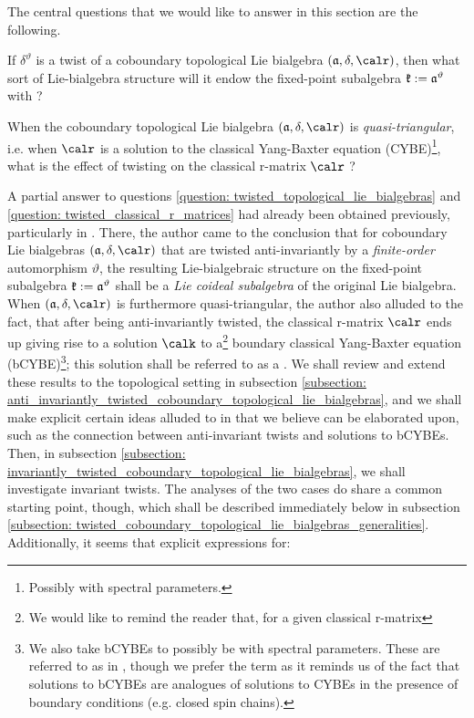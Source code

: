         The central questions that we would like to answer in this section are the following.
        \begin{question} \label{question: twisted_topological_lie_bialgebras}
            If $\delta^{\vartheta}$ is a twist of a coboundary topological Lie bialgebra $(\a, \delta, \calr)$, then what sort of Lie-bialgebra structure will it endow the fixed-point subalgebra $\mathfrak{k} := \mathfrak{a}^{\vartheta}$ with ?
        \end{question}
        \begin{question} \label{question: twisted_classical_r_matrices}
            When the coboundary topological Lie bialgebra $(\a, \delta, \calr)$ is \textit{quasi-triangular}, i.e. when $\calr$ is a solution to the classical Yang-Baxter equation (CYBE)\footnote{Possibly with spectral parameters.}, what is the effect of twisting on the classical r-matrix $\calr$ ?
        \end{question}
        A partial answer to questions \ref{question: twisted_topological_lie_bialgebras} and \ref{question: twisted_classical_r_matrices} had already been obtained previously, particularly in \cite{schrader_integrable_systems_from_classical_reflection_equations}. There, the author came to the conclusion that for  coboundary Lie bialgebras $(\a, \delta, \calr)$ that are twisted anti-invariantly by a \textit{finite-order} automorphism $\vartheta$, the resulting Lie-bialgebraic structure on the fixed-point subalgebra $\mathfrak{k} := \mathfrak{a}^{\vartheta}$ shall be a \textit{Lie coideal subalgebra} of the original Lie bialgebra. When $(\a, \delta, \calr)$ is furthermore quasi-triangular, the author also alluded to the fact, that after being anti-invariantly twisted, the classical r-matrix $\calr$ ends up giving rise to a solution $\calk$ to a\footnote{We would like to remind the reader that, for a given classical r-matrix} boundary classical Yang-Baxter equation (bCYBE)\footnote{We also take bCYBEs to possibly be with spectral parameters. These are referred to as  in \cite{schrader_integrable_systems_from_classical_reflection_equations}, though we prefer the term  as it reminds us of the fact that solutions to bCYBEs are analogues of solutions to CYBEs in the presence of boundary conditions (e.g. closed spin chains).}; this solution shall be referred to as a . We shall review and extend these results to the topological setting in subsection \ref{subsection: anti_invariantly_twisted_coboundary_topological_lie_bialgebras}, and we shall make explicit certain ideas alluded to in \cite{schrader_integrable_systems_from_classical_reflection_equations} that we believe can be elaborated upon, such as the connection between anti-invariant twists and solutions to bCYBEs. Then, in subsection \ref{subsection: invariantly_twisted_coboundary_topological_lie_bialgebras}, we shall investigate invariant twists. The analyses of the two cases do share a common starting point, though, which shall be described immediately below in subsection \ref{subsection: twisted_coboundary_topological_lie_bialgebras_generalities}. Additionally, it seems that explicit expressions for:
